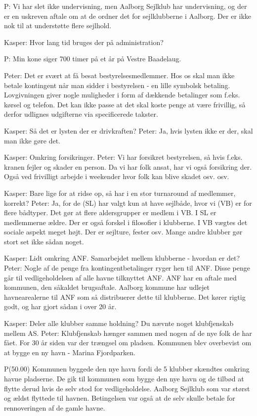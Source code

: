 P: Vi har slet ikke undervisning, men Aalborg Sejlklub har undervisning, og der er en uskreven aftale om at de ordner det for sejlklubberne i Aalborg. Der er ikke nok til at understøtte flere sejlhold.


Kasper: Hvor lang tid bruges der på administration?

P: Min kone siger 700 timer på et år på Vestre Baadelaug.


Peter: Det er svært at få besat bestyrelsesmedlemmer. Hos os skal man ikke betale kontingent når man sidder i bestyrelsen - en lille symbolsk betaling. Lovgivningen giver nogle muligheder i form af dækkende betalinger som f.eks. kørsel og telefon. Det kan ikke passe at det skal koste penge at være frivillig, så derfor udlignes udgifterne via specificerede takster.

Kasper: Så det er lysten der er drivkraften? Peter: Ja, hvis lysten ikke er der, skal man ikke gøre det.

Kasper: Omkring forsikringer. Peter: Vi har forsikret bestyrelsen, så hvis f.eks. kranen fejler og skader en person. Da vi har folk ansat, har vi også forsikring der. Også ved frivilligt arbejde i weekender hvor folk kan blive skadet osv. osv.

Kasper: Bare lige for at ridse op, så har i en stor turnaround af medlemmer, korrekt? Peter: Ja, for de (SL) har valgt kun at have sejlbåde, hvor vi (VB) er for flere bådtyper. Det gør at flere aldersgrupper er medlem i VB. I SL er medlemmerne ældre. Der er også forskel i filosofier i klubberne. I VB vægtes det sociale aspekt meget højt. Der er sejlture, fester osv. Mange andre klubber gør stort set ikke sådan noget.

Kasper: Lidt omkring ANF. Samarbejdet mellem klubberne - hvordan er det? Peter: Nogle af de penge fra kontingentbetalinger ryger hen til ANF. Disse penge går til vedligeholdelsen af alle havne tilknyttet ANF. ANF har en aftale med kommunen, den såkaldet brugsaftale. Aalborg kommune har udlejet havnearealerne til ANF som så distribuerer dette til klubberne. Det kører rigtig godt, og har gjort sådan i over 20 år.

Kasper: Deler alle klubber samme holdning? Du nævnte noget klubfjenskab mellem AS. Peter: Klubfjenskab hænger sammen med nogen af de nye folk de har fået. For 30 år siden var der trængsel om pladsen. Kommunen blev overbevist om at bygge en ny havn - Marina Fjordparken.

P(50.00) Kommunen byggede den nye havn fordi de 5 klubber skændtes omkring havne
pladserne. De gik til kommunen som bygge den nye havn og de tilbød at flytte 
derud hvis de selv stod for vedligeholdelse. Aalborg Sejlklub som var størst og ældst
flyttede til havnen. Betingelsen var også at de selv skulle betale for rennoveringen
af de gamle havne.

